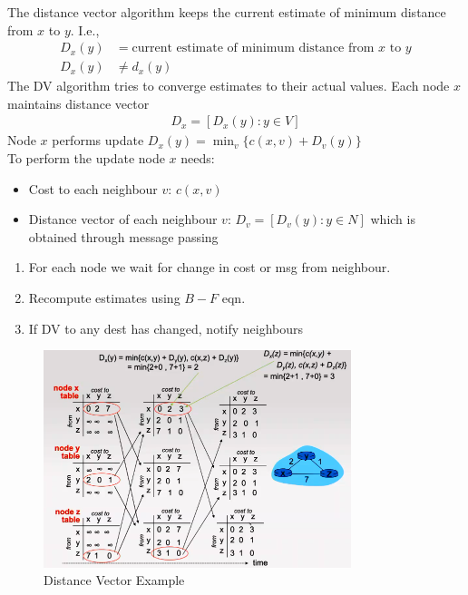 \documentclass[a4paper]{article}
\theoremstyle{plain}
\theoremstyle{definition}
\newtheorem{defn}{Definition}[section]
\newtheorem{exmp}{Example}[section]
\theoremstyle{remark}
\begin{document}
\begin{tcolorbox}[colback=black!3!white,colframe=black!60!white,title=\begin{defn}Distance Vector Algorithm \label{Distance Vector Algorithm}\end{defn}]
The distance vector algorithm keeps the current estimate of minimum distance from $x$ to $y$. I.e.,
\begin{align*}
	D_x(y) &= \text{current estimate of minimum distance from $x$ to $y$} \\
	D_x(y) &\neq d_x(y)
\end{align*}
The DV algorithm tries to converge estimates to their actual values. Each node $x$ maintains distance vector
\begin{align*}
	D_x = [D_x(y) : y \in V]
\end{align*}
Node $x$ performs update $D_x(y) = \min_{v} \{c(x,v)+D_v(y)\}$ \\
To perform the update node $x$ needs:
\begin{itemize}
	\item Cost to each neighbour $v$: $c(x,v)$ 
	\item Distance vector of each neighbour $ v$: $D_v=[D_v(y) : y\in N]$ which is obtained through message passing
\end{itemize}
\begin{enumerate}
	\item For each node we wait for change in cost or msg from neighbour.
	\item Recompute estimates using $B-F$ eqn. 
	\item If DV to any dest has changed, notify neighbours
\end{enumerate}
\end{tcolorbox}
\begin{tcolorbox}[colback=black!3!white,colframe=black!60!white,title=\begin{exmp}Distance Vector \label{Distance Vector}\end{exmp}]
\begin{figure}[H]
	\centering
	\includegraphics[width=0.8\textwidth]{eightyfour.png}
	\caption{Distance Vector Example}
	\label{fig:eightyfour-png}
\end{figure}
\end{tcolorbox}
\end{document}
